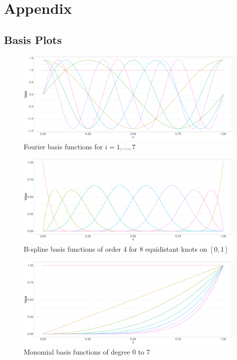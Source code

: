\documentclass[11pt,twoside,a4paper]{article}
\begin{document}
	\newpage
	\section{Appendix}
	
	\subsection{Basis Plots}
	
	\begin{figure}[H]\label{fourier_basis}
		\includegraphics[width = \textwidth]{../Graphics/Fourier_Basis.pdf}
		\caption{Fourier basis functions for $i = 1,\dots,7$}
	\end{figure}
	
	\begin{figure}[H]\label{bspline_basis}
		\includegraphics[width = \textwidth]{../Graphics/Bspline_Basis.pdf}
		\caption{B-spline basis functions of order 4 for 8 equidistant knots on $[0,1]$}
	\end{figure}

	\begin{figure}[H]\label{monomial_basis}
		\includegraphics[width = \textwidth]{../Graphics/Monomial_Basis.pdf}
		\caption{Monomial basis functions of degree 0 to 7}
	\end{figure}
\end{document}
